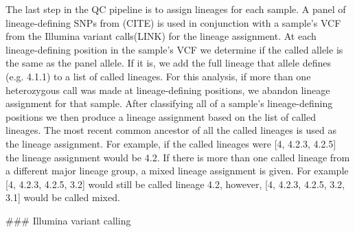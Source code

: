 \begin{markdown}
The last step in the QC pipeline is to assign lineages for each sample. A panel of lineage-defining SNPs from (CITE) is used in conjunction with a sample's VCF from the Illumina variant calls(LINK) for the lineage assignment. At each lineage-defining position in the sample's VCF we determine if the called allele is the same as the panel allele. If it is, we add the full lineage that allele defines (e.g. 4.1.1) to a list of called lineages. For this analysis, if more than one heterozygous call was made at lineage-defining positions, we abandon lineage assignment for that sample. After classifying all of a sample's lineage-defining positions we then produce a lineage assignment based on the list of called lineages. The most recent common ancestor of all the called lineages is used as the lineage assignment. For example, if the called lineages were [4, 4.2.3, 4.2.5] the lineage assignment would be 4.2. If there is more than one called lineage from a different major lineage group, a mixed lineage assignment is given. For example [4, 4.2.3, 4.2.5, 3.2] would still be called lineage 4.2, however, [4, 4.2.3, 4.2.5, 3.2, 3.1] would be called mixed.


### Illumina variant calling




\end{markdown}